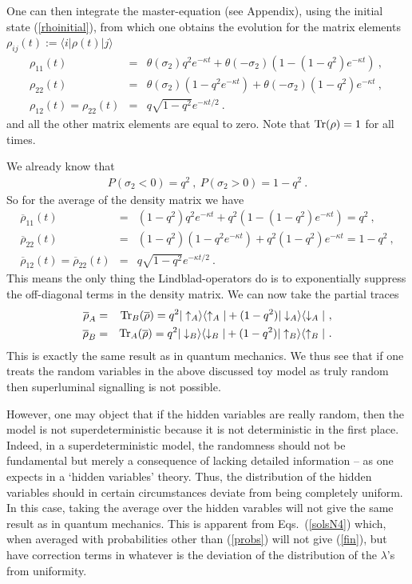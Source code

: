 \documentclass[11pt,twoside,A4]{article}
\def\beqn{\begin{eqnarray}}
\def\eeqn{\end{eqnarray}}
\begin{document}
One can then integrate the master-equation (see Appendix), using the initial state (\ref{rhoinitial}), from which one obtains  the evolution for the matrix elements $\rho_{ij}(t):=\langle i|\rho(t)|j\rangle$
\beqn
\rho_{11}(t) &=& \theta(\sigma_2) q^2 e^{- \kappa t}  + \theta(-\sigma_2) \left(1 - \left(1-q^2 \right)e^{ -\kappa t}  \right) ~,~\nonumber \\
 \rho_{22}(t) &=& \theta(\sigma_2) (1-  q^2 e^{- \kappa t}) + \theta(-\sigma_2) \left( 1 - q^2 \right) e^{ -\kappa t}
~,\nonumber \\
\rho_{12}(t) =\rho_{22}(t) &=& q\sqrt{1-q^2} e^{- \kappa t/2} ~. \label{solsN4}
\eeqn
and all the other matrix elements are equal to zero. Note that  ${\rm Tr}(\rho) = 1$ for all times. 
 
We already know that
\beqn
P(\sigma_2 < 0) = q^2~,~P(\sigma_2 > 0) = 1-q^2~. \label{probs}
\eeqn
So for the average of the density matrix 
we have
\beqn
\overline \rho_{11}(t) &=& (1-q^2) q^2 e^{- \kappa t}  + q^2 \left(1 - \left(1-q^2 \right)e^{ - \kappa t}  \right) = q^2 ~, \nonumber \\
\overline \rho_{22}(t) &=& (1-q^2)(1-  q^2 e^{- \kappa t})  + q^2\left( 1 - q^2 \right) e^{ -\kappa t} = 1- q^2 ~, \nonumber \\
\overline \rho_{12}(t) = \overline \rho_{22}(t) &=& q\sqrt{1-q^2} e^{- \kappa t/2} ~. \label{fin}
\eeqn
This means the only thing the Lindblad-operators do is to exponentially suppress the off-diagonal terms in the density matrix. 
We can now take the partial traces
\beqn
\overline \rho_A &=& {\rm Tr}_B (\overline \rho) = q^2  |\uparrow_{A} \rangle \langle  \uparrow_{A} | + (1-q^2) |\downarrow_{A} \rangle \langle  \downarrow_{A} | ~,\\
\overline \rho_B &=& {\rm Tr}_A (\overline \rho) = q^2  |\downarrow_{B} \rangle \langle  \downarrow_{B} | + (1-q^2) |\uparrow_{B} \rangle \langle  \uparrow_{B} | ~.
\eeqn
This is exactly the same result as in quantum mechanics.
We thus see that if one treats the random variables in the above discussed toy model as truly random then superluminal signalling is not possible. 

However, one may object that if the hidden variables are really random, then the model is not superdeterministic because it is not deterministic in the first place. Indeed, in a superdeterministic model, the randomness should not be fundamental but merely a consequence of lacking detailed information -- as one expects in a `hidden variables' theory. Thus, the distribution of the hidden variables should in certain circumstances deviate from being completely uniform. In this case, taking the average over the hidden varables will not give the same result as in quantum mechanics. This is apparent from Eqs.\ (\ref{solsN4}) which, when averaged with probabilities other than (\ref{probs}) will not give (\ref{fin}), but have correction terms in whatever is the deviation of the distribution of the $\lambda$'s from uniformity.
\end{document}

